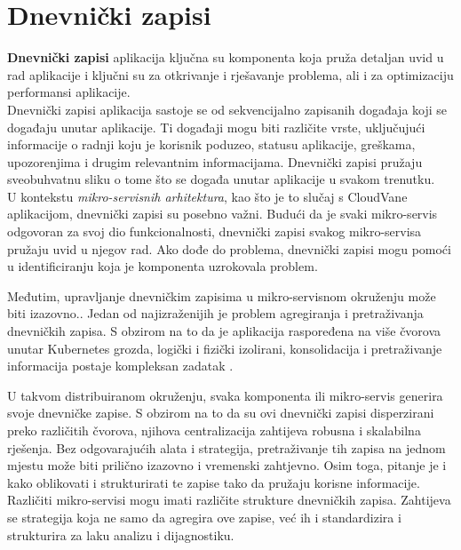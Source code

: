 \documentclass[times, utf8, diplomski]{fer}
\begin{document}
\clearpage
\section{Dnevnički zapisi}
\label{sec:logs}

\textbf{Dnevnički zapisi} aplikacija  ključna su komponenta koja pruža detaljan uvid u rad aplikacije i ključni su za otkrivanje i rješavanje problema, ali i za optimizaciju performansi aplikacije.\\

Dnevnički zapisi aplikacija sastoje se od sekvencijalno zapisanih događaja koji se događaju unutar aplikacije. Ti događaji mogu biti različite vrste, uključujući informacije o radnji koju je korisnik poduzeo, statusu aplikacije, greškama, upozorenjima i drugim relevantnim informacijama. Dnevnički zapisi pružaju sveobuhvatnu sliku o tome što se događa unutar aplikacije u svakom trenutku.\\

U kontekstu \emph{mikro-servisnih arhitektura}, kao što je to slučaj s CloudVane aplikacijom, dnevnički zapisi su posebno važni. Budući da je svaki mikro-servis odgovoran za svoj dio funkcionalnosti, dnevnički zapisi svakog mikro-servisa pružaju uvid u njegov rad. Ako dođe do problema, dnevnički zapisi mogu pomoći u identificiranju koja je komponenta uzrokovala problem.

Međutim, upravljanje dnevničkim zapisima u mikro-servisnom okruženju može biti izazovno.. Jedan od najizraženijih je problem agregiranja i pretraživanja dnevničkih zapisa. S obzirom na to da je aplikacija raspoređena na više čvorova unutar Kubernetes grozda, logički i fizički izolirani, konsolidacija i pretraživanje informacija postaje kompleksan zadatak \citep{newman_building_2015}.

U takvom distribuiranom okruženju, svaka komponenta ili mikro-servis generira svoje dnevničke zapise. S obzirom na to da su ovi dnevnički zapisi disperzirani preko različitih čvorova, njihova centralizacija zahtijeva robusna i skalabilna rješenja. Bez odgovarajućih alata i strategija, pretraživanje tih zapisa na jednom mjestu može biti prilično izazovno i vremenski zahtjevno. Osim toga, pitanje je i kako oblikovati i strukturirati te zapise tako da pružaju korisne informacije. Različiti mikro-servisi mogu imati različite strukture dnevničkih zapisa. Zahtijeva se strategija koja ne samo da agregira ove zapise, već ih i standardizira i strukturira za laku analizu i dijagnostiku. \\
\end{document}
